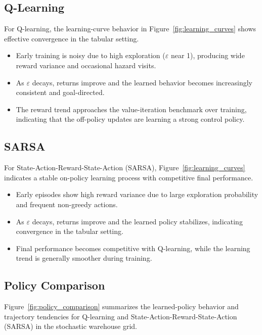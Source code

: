\documentclass[10pt,twocolumn]{article}
\begin{document}
\subsection{Q-Learning}

For Q-learning, the learning-curve behavior in Figure~\ref{fig:learning_curves} shows effective convergence in the tabular setting.

\begin{itemize}
	\item Early training is noisy due to high exploration ($\varepsilon$ near 1), producing wide reward variance and occasional hazard visits.
	\item As $\varepsilon$ decays, returns improve and the learned behavior becomes increasingly consistent and goal-directed.
	\item The reward trend approaches the value-iteration benchmark over training, indicating that the off-policy updates are learning a strong control policy.
\end{itemize}

\subsection{SARSA}

For State-Action-Reward-State-Action (SARSA), Figure~\ref{fig:learning_curves} indicates a stable on-policy learning process with competitive final performance.

\begin{itemize}
	\item Early episodes show high reward variance due to large exploration probability and frequent non-greedy actions.
	\item As $\varepsilon$ decays, returns improve and the learned policy stabilizes, indicating convergence in the tabular setting.
	\item Final performance becomes competitive with Q-learning, while the learning trend is generally smoother during training.
\end{itemize}

\subsection{Policy Comparison}

Figure~\ref{fig:policy_comparison} summarizes the learned-policy behavior and trajectory tendencies for Q-learning and State-Action-Reward-State-Action (SARSA) in the stochastic warehouse grid.
\end{document}
